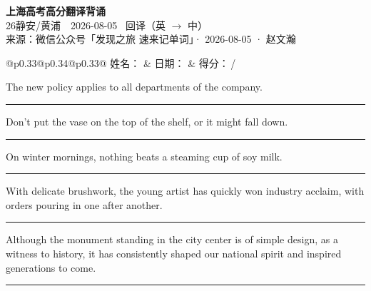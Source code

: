 \documentclass[11pt,a4paper]{article}
\newcommand{\num}[1]{\makebox[1.9em][r]{#1.}\hspace{0.3em}}
\newcommand{\wline}{\noindent\rule{\linewidth}{0.4pt}}
\begin{document}
\pagestyle{plain}
\begin{center}
{\LARGE\bfseries 上海高考高分翻译背诵 }\\[0.25em]
{\large 26静安/黄浦　2026-08-05 \quad\ 回译（英 $\to$ 中）}\\[0.35em]
{\footnotesize 来源：微信公众号「发现之旅 速来记单词」· 2026-08-05 · 赵文瀚}
\end{center}

\vspace{0.4em}
\noindent\begin{tabular}{@{}p{0.33\textwidth}@{}p{0.34\textwidth}@{}p{0.33\textwidth}@{}}
姓名：\underline{\hspace{2.0cm}} & 日期：\underline{\hspace{2.0cm}} & 得分：\underline{\hspace{1.4cm}}\,/ \\
\end{tabular}

\vspace{0.5em}

\vspace{0.8em}
\num{1}The new policy applies to all departments of the company.

\vspace{0.25em}

\wline

\num{2}Don’t put the vase on the top of the shelf, or it might fall down.

\vspace{0.25em}

\wline

\num{3}On winter mornings, nothing beats a steaming cup of soy milk.

\vspace{0.25em}

\wline

\num{4}With delicate brushwork, the young artist has quickly won industry acclaim, with orders pouring in one after another.

\vspace{0.25em}

\wline

\num{5}Although the monument standing in the city center is of simple design, as a witness to history, it has consistently shaped our national spirit and inspired generations to come.

\vspace{0.25em}

\wline
\end{document}
